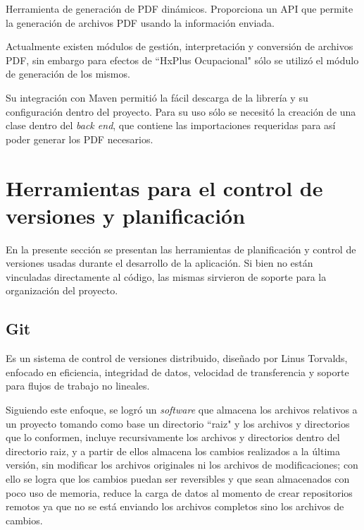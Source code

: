         Herramienta de generación de PDF dinámicos\cite{ITEXT-basico}. Proporciona un API que permite la generación de archivos PDF usando la información enviada.
        
        Actualmente existen módulos de gestión, interpretación y conversión de archivos PDF, sin embargo para efectos de ``HxPlus Ocupacional" sólo se utilizó el módulo de generación de los mismos.
        
        Su integración con Maven permitió la fácil descarga de la librería y su configuración dentro del proyecto. Para su uso sólo se necesitó la creación de una clase dentro del \textit{back end}, que contiene las importaciones requeridas para así poder generar los PDF necesarios.
        
    \section{Herramientas para el control de versiones y planificación}
    
    En la presente sección se presentan las herramientas de planificación y control de versiones usadas durante el desarrollo de la aplicación. Si bien no están vinculadas directamente al código, las mismas sirvieron de soporte para la organización del proyecto.
    
        \subsection{Git}
        \label{tecno-git}
        
        Es un sistema de control de versiones distribuido, diseñado por Linus Torvalds, enfocado en eficiencia, integridad de datos, velocidad de transferencia y soporte para flujos de trabajo no lineales.
        
        Siguiendo este enfoque, se logró un \textit{software} que almacena los archivos relativos a un proyecto tomando como base un directorio ``raiz" y los archivos y directorios que lo conformen, incluye recursivamente los archivos y directorios dentro del directorio raiz, y  a partir de ellos almacena los cambios realizados a la última versión, sin modificar los archivos originales ni los archivos de modificaciones; con ello se logra que los cambios puedan ser reversibles y que sean almacenados con poco uso de memoria, reduce la carga de datos al momento de crear repositorios remotos ya que no se está enviando los archivos completos sino los archivos de cambios.
        
